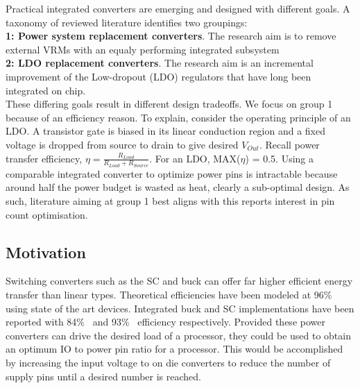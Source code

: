 \documentclass[letterpaper,twocolumn,10pt]{article}
\begin{document}
Practical integrated converters are emerging and designed with different goals. A taxonomy of reviewed literature identifies two groupings:\\
\textbf{1: Power system replacement converters}. The research aim is to remove external VRMs with an equaly performing integrated subsystem\\
\textbf{2: LDO replacement converters}. The research aim is an incremental improvement of the Low-dropout (LDO) regulators that have long been integrated on chip.\\
These differing goals result in different design tradeoffs. We focus on group 1 because of an efficiency reason. To explain, consider the operating principle of an LDO. A transistor gate is biased in its linear conduction region and a fixed voltage is dropped from source to drain to give desired $V_{Out}$. Recall power transfer efficiency, $\eta = \frac{R_{Load}}{R_{Load} + R_{Source}}$. For an LDO, MAX($\eta$) = 0.5. Using a comparable integrated converter to optimize power pins is intractable because around half the power budget is wasted as heat, clearly a sub-optimal design. As such, literature aiming at group 1 best aligns with this reports interest in pin count optimisation.\\  

\subsection{Motivation}
Switching converters such as the SC and buck can offer far higher efficient energy transfer than linear types. Theoretical efficiencies have been modeled at 96\%~\cite{Rodriguez2014} using state of the art devices. Integrated buck and SC implementations have been reported with 84\%~\cite{Cheng2013} and 93\%~\cite{Damak2013} efficiency respectively. Provided these power converters can drive the desired load of a processor, they could be used to obtain an optimum IO to power pin ratio for a processor. This would be accomplished by increasing the input voltage to on die converters to reduce the number of supply pins until a desired number is reached.  
\end{document}
